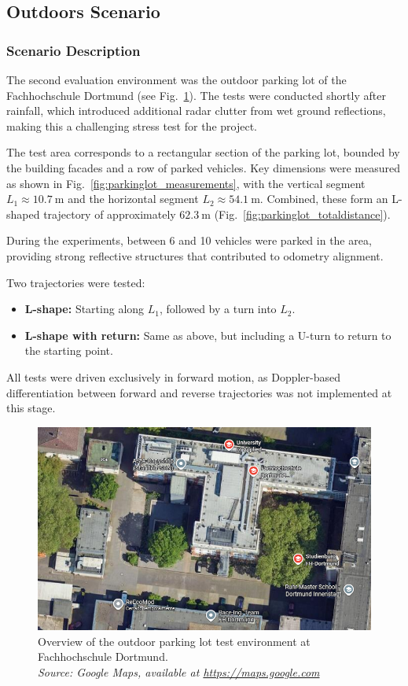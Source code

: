 \subsection{Outdoors Scenario}
\subsubsection{Scenario Description}
The second evaluation environment was the outdoor parking lot of the Fachhochschule Dortmund (see Fig.~\ref{fig:parking_lot_overview}).  
The tests were conducted shortly after rainfall, which introduced additional radar clutter from wet ground reflections, making this a challenging stress test for the project.  

The test area corresponds to a rectangular section of the parking lot, bounded by the building facades and a row of parked vehicles.  
Key dimensions were measured as shown in Fig.~\ref{fig:parkinglot_measurements}, with the vertical segment $L_1 \approx \SI{10.7}{\meter}$ and the horizontal segment $L_2 \approx \SI{54.1}{\meter}$.  
Combined, these form an L-shaped trajectory of approximately $\SI{62.3}{\meter}$ (Fig.~\ref{fig:parkinglot_totaldistance}).  

During the experiments, between 6 and 10 vehicles were parked in the area, providing strong reflective structures that contributed to odometry alignment.  

Two trajectories were tested:
\begin{itemize}
    \item \textbf{L-shape:} Starting along $L_1$, followed by a turn into $L_2$.
    \item \textbf{L-shape with return:} Same as above, but including a U-turn to return to the starting point.
\end{itemize}

All tests were driven exclusively in forward motion, as Doppler-based differentiation between forward and reverse trajectories was not implemented at this stage.

\begin{figure}[!htbp]
    \centering
    \includegraphics[width=0.9\linewidth]{images/FH_ParkingLot.png}
    \caption{Overview of the outdoor parking lot test environment at Fachhochschule Dortmund.\\
    \textit{Source: Google Maps, available at \url{https://maps.google.com} \cite{googlemaps_fhdo}}}
    \label{fig:parking_lot_overview}
\end{figure}

